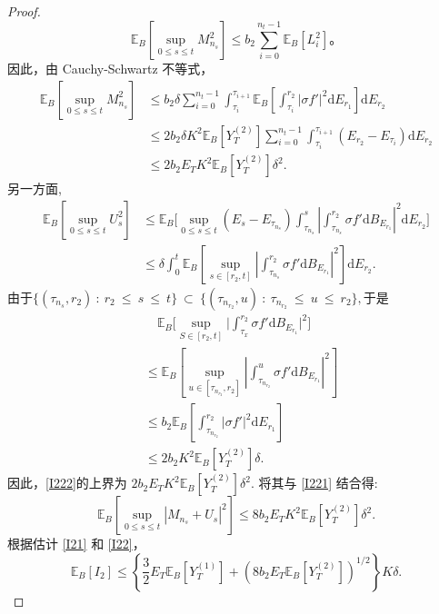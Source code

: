 \begin{proof}
	$$
	\mathbb{E}_B \left[\sup_{0 \leq s \leq t} M_{n_s}^2\right] \leq b_2 \sum_{i=0}^{n_t-1} \mathbb{E}_B [L_i^2]。
	$$
	因此，由 Cauchy-Schwartz 不等式，
	\begin{align}
		\mathbb{E}_B\left[\sup_{0\leq s\leq t}M_{n_s}^2\right] 
		&\leq b_2\delta\sum_{i=0}^{n_t-1}\int_{\tau_i}^{\tau_{i+1}}\mathbb{E}_B
		\left[\int_{\tau_i}^{r_2}\left|\sigma f'\right|^2\mathrm{d}E_{r_1}\right]
		\mathrm{d}E_{r_2} \nonumber \\
		&\leq2b_2\delta K^2\mathbb{E}_B[Y_T^{(2)}]\sum_{i=0}^{n_t-1}\int_{\tau_i}^
		{\tau_{i+1}}(E_{r_2}-E_{\tau_i})\mathrm{d}E_{r_2} \nonumber \\
		&\leq 2b_2E_TK^2\mathbb{E}_B[Y_T^{(2)}]\delta^2. \label{I221}
	\end{align}
	另一方面, 
	\begin{align}
		\mathbb{E}_B\left[\sup_{0\leq s\leq t}U_s^2\right]  
		&\leq\mathbb{E}_B\biggl[\sup_{0\leq s\leq t}(E_s-E_{\tau_{n_s}})\int_{\tau_{n_s}}^s\left|\int_{\tau_{n_s}}^{r_2}\sigma f'\mathrm{d}B_{E_{r_1}}\right|^2\mathrm{d}E_{r_2}\biggr] \nonumber \\ &\leq\delta\int_0^t\mathbb{E}_B\left[\sup_{s\in[r_2,t]}\left|\int_{\tau_{n_s}}^{r_2}\sigma f'\mathrm{d}B_{E_{r_1}}\right|^2\right]\mathrm{d}E_{r_2}.\label{I222}
	\end{align}
	由于$\{(\tau_{n_s},r_2)~:~r_2~\leq~s~\leq~t\}~\subset~\{(\tau_{n_{r_2}},u)~:~\tau_{n_{r_2}}~\leq~u~\leq~r_2\},$于是
	\begin{align*}
		&\quad\mathbb{E}_B\Big[\sup_{S\in[r_2,t]}\Big|\int_{\tau_x}^{r_2}\sigma f'\mathrm{d}B_{E_{r_1}}\Big|^2\Big]  \\
		&\le \mathbb{E}_B\left[\sup_{u\in[\tau_{n_{r_2}},r_2]}\left|\int_{\tau_{n_{r_2}}}^u\sigma f'\mathrm{d}B_{E_{r_1}}\right|^2\right] \\
		&\leq b_2\mathbb{E}_B\left[\int_{\tau_{n_{r_2}}}^{r_2}\left|\sigma f'\right|^2\mathrm{d}E_{r_1}\right]\\
		&\leq 2b_2K^2\mathbb{E}_B[Y_T^{(2)}]\delta.
	\end{align*}
	因此，\cref{I222}的上界为  $2b_2E_TK^2\mathbb{E}_B[Y_T^{(2)}]\delta^2.$ 将其与 \cref{I221} 结合得:
	\begin{equation}\label{I22}
		\mathbb{E}_B\left[\sup_{0\leq s\leq t}|M_{n_s}+U_s|^2\right] 
		\leq 8b_2E_TK^2\mathbb{E}_B[Y_T^{(2)}]\delta^2. 
	\end{equation}
	根据估计 \cref{I21} 和 \cref{I22}，
	\begin{equation}\label{I2}
		\mathbb{E}_B[I_2] 
		\leq \left\{\frac{3}{2}E_T\mathbb{E}_B[Y_T^{(1)}]+(8b_2E_T\mathbb{E}_B[Y_T^{(2)}])^{1/2}\right\}K\delta. 
	\end{equation}
	

\end{proof}
